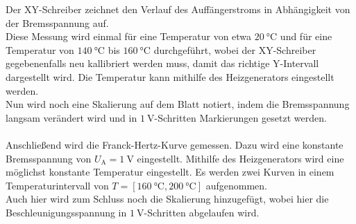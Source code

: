     Der XY-Schreiber zeichnet den Verlauf des Auffängerstroms in Abhängigkeit von der Bremsspannung auf.\\
    Diese Messung wird einmal für eine Temperatur von etwa $\SI{20}{\celsius}$ und für eine Temperatur von $\SI{140}{\celsius}$ bis $\SI{160}{\celsius}$ durchgeführt,
    wobei der XY-Schreiber gegebenenfalls neu kallibriert werden muss,
    damit das richtige Y-Intervall dargestellt wird.
    Die Temperatur kann mithilfe des Heizgenerators eingestellt werden.\\
    Nun wird noch eine Skalierung auf dem Blatt notiert,
    indem die Bremsspannung langsam verändert wird und in $\SI{1}{\volt}$-Schritten Markierungen gesetzt werden.\\
    \\
    Anschließend wird die Franck-Hertz-Kurve gemessen.
    Dazu wird eine konstante Bremsspannung von $U_\text{A} = \SI{1}{\volt}$ eingestellt.
    Mithilfe des Heizgenerators wird eine möglichst konstante Temperatur eingestellt.
    Es werden zwei Kurven in einem Temperaturintervall von $T = [\SI{160}{\celsius}, \SI{200}{\celsius}]$ aufgenommen.\\
    Auch hier wird zum Schluss noch die Skalierung hinzugefügt,
    wobei hier die Beschleunigungsspannung in $\SI{1}{\volt}$-Schritten abgelaufen wird.